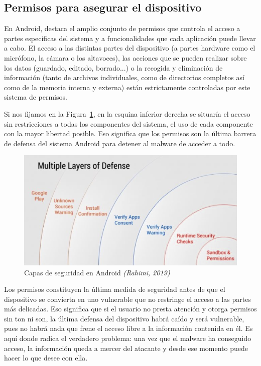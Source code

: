 \subsection{Permisos para asegurar el dispositivo}
\label{sec121}

En Android, destaca el amplio conjunto de permisos que controla el acceso a partes especificas del sistema y a funcionalidades que cada aplicación puede llevar a cabo. El acceso a las distintas partes del dispositivo (a partes hardware como el micrófono, la cámara o los altavoces), las acciones que se pueden realizar sobre los datos (guardado, editado, borrado...) o la recogida y eliminación de información (tanto de archivos individuales, como de directorios completos así como de la memoria interna y externa) están estrictamente controladas por este sistema de permisos.

Si nos fijamos en la Figura~\ref{fig:layers}, en la esquina inferior derecha se situaría el acceso sin restricciones a todas los componentes del sistema, el uso de cada componente con la mayor libertad posible. Eso significa que los permisos son la última barrera de defensa del sistema Android para detener al malware de acceder a todo.

\begin{figure}[H]
\centering
	\includegraphics[scale=0.65]{img/layers.png}
	\caption{Capas de seguridad en Android \textit{(Rahimi, 2019)}}
	\label{fig:layers}
\end{figure}

Los permisos constituyen la última medida de seguridad antes de que el dispositivo se convierta en uno vulnerable que no restringe el acceso a las partes más delicadas. Eso significa que si el usuario no presta atención y otorga permisos sin ton ni son, la última defensa del dispositivo habrá caído y será vulnerable, pues no habrá nada que frene el acceso libre a la información contenida en él. Es aquí donde radica el verdadero problema: una vez que el malware ha conseguido acceso, la información queda a mercer del atacante y desde ese momento puede hacer lo que desee con ella.

